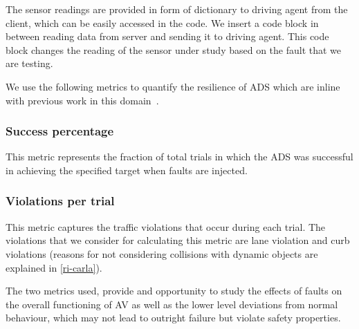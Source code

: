 The sensor readings are provided in form of dictionary to driving agent from the client, which can be easily accessed in the code. We insert a code block in between reading data from server and sending it to driving agent. This code block changes the reading of the sensor under study based on the fault that we are testing.

We use the following metrics to quantify the resilience of ADS which are inline with previous work in this domain~\cite{avfi}.
\setcounter{subsubsection}{0}

\medskip
\subsubsection{Success percentage} This metric represents the fraction of total trials in which the ADS was successful in achieving the specified target when faults are injected.

\smallskip

\subsubsection{Violations per trial} This metric captures the traffic violations that occur during each trial. The violations that we consider for calculating this metric are lane violation and curb violations (reasons for not considering collisions with dynamic objects are explained in \ref{ri-carla}). 

The two metrics used, provide and opportunity to study the effects of faults on the overall functioning of AV as well as the lower level deviations from normal behaviour, which may not lead to outright failure but violate safety properties. 


